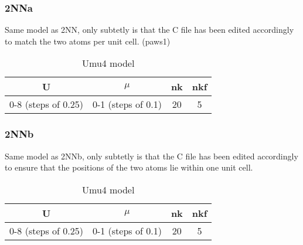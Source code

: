 \documentclass{article}
\begin{document}
\subsubsection{2NNa }

Same model as 2NN, only subtetly is that the C file has been edited accordingly to match the two atoms per unit cell. 
 (paws1)
\begin{table}[h]
    \centering
    \begin{tabular}{|c|c|c|c|}
        \hline
        U & $\mu$ &  nk & nkf\\ \hline
        0-8 (steps of 0.25)  &  0-1 (steps of 0.1)  & 20   & 5  \\ \hline
    \end{tabular}
    \caption{Umu4 model}
    \label{tab:example_table}
\end{table}


\subsubsection{2NNb }

Same model as 2NNb, only subtetly is that the C file has been edited accordingly to ensure that the positions of the two atoms lie within one unit cell. 

\begin{table}[h]
    \centering
    \begin{tabular}{|c|c|c|c|}
        \hline
        U & $\mu$ &  nk & nkf\\ \hline
        0-8 (steps of 0.25)  &  0-1 (steps of 0.1)  & 20   & 5  \\ \hline
    \end{tabular}
    \caption{Umu4 model}
    \label{tab:example_table}
\end{table}
\end{document}
